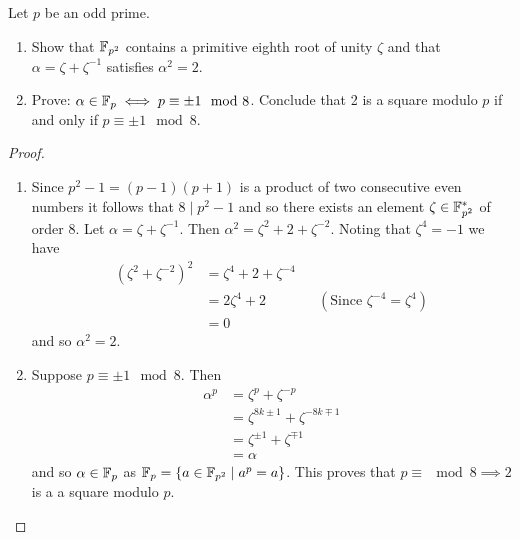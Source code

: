 \begin{ex}{22.13}
    Let $p$ be an odd prime. 
    \begin{enumerate}
        \item Show that $\mathbb{F}_{p^2}$ contains a primitive eighth root of unity $\zeta$ and that $\alpha=\zeta+\zeta^{-1}$ satisfies $\alpha^2=2$.
        \item Prove: $\alpha\in\mathbb{F}_p\iff p\equiv\pm 1\mod 8$. Conclude that 2 is a square modulo $p$ if and only if $p\equiv\pm 1\mod 8$.
    \end{enumerate}
\end{ex}
\begin{proof}
    ${}$
    \begin{enumerate}
        \item Since $p^2-1=(p-1)(p+1)$ is a product of two consecutive even numbers it follows that $8\mid p^2-1$ and so there exists an element $\zeta\in\mathbb{F}_{p^2}^*$ of order 8.
            Let $\alpha=\zeta+\zeta^{-1}$. Then $\alpha^2=\zeta^2+2+\zeta^{-2}$. Noting that $\zeta^4=-1$ we have
            \begin{align*}
                \left(\zeta^2+\zeta^{-2}\right)^2&=\zeta^4+2+\zeta^{-4}\\
                &=2\zeta^4+2&&(\text{Since }\zeta^{-4}=\zeta^4)\\
                &=0
            \end{align*}
            and so $\alpha^2=2$. 
        \item Suppose $p\equiv\pm 1\mod 8$. Then 
            \begin{align*}
                \alpha^p &= \zeta^p+\zeta^{-p}\\
                &=\zeta^{8k\pm 1}+\zeta^{-8k\mp 1}\\
                &=\zeta^{\pm 1}+\zeta^{\mp 1}\\
                &=\alpha
            \end{align*}
            and so $\alpha\in\mathbb{F}_p$ as $\mathbb{F}_p=\{a\in\mathbb{F}_{p^2}\mid a^p = a\}$. 
            This proves that $p\equiv\mod 8\implies 2$ is a a square modulo $p$. 


\end{enumerate}
\end{proof}
